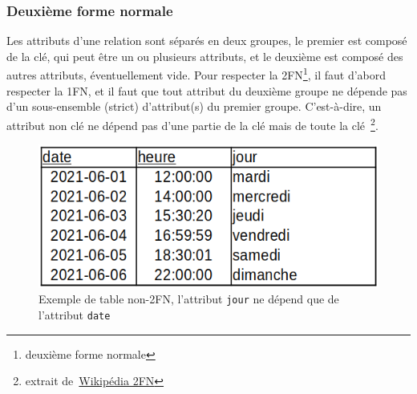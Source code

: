\documentclass[12pt]{article}
\begin{document}
        \subsubsection{Deuxième forme normale}
            Les attributs d’une relation sont séparés en deux groupes, le premier est composé de la clé, qui peut être un ou plusieurs attributs, et le deuxième est composé des autres attributs, éventuellement vide. Pour respecter la 2FN\footnote{deuxième forme normale}, il faut d'abord respecter la 1FN, et il faut que tout attribut du deuxième groupe ne dépende pas d’un sous-ensemble (strict) d’attribut(s) du premier groupe. C'est-à-dire, un attribut non clé ne dépend pas d’une partie de la clé mais de toute la clé~\footnote{extrait de~\href{https://fr.wikipedia.org/wiki/Forme\_normale\_(bases\_de\_données\_relationnelles)}{\textsf{Wikipédia 2FN}}}.
            \begin{figure}[!h]
                \centering
                \includegraphics[scale = 0.5]{Images/Etat de l'art/non-2FN.png}
                \caption{Exemple de table non-2FN, l'attribut \texttt{jour} ne dépend que de l'attribut \texttt{date}}
                \label{fig:non-2FN}
            \end{figure}
        
\end{document}
